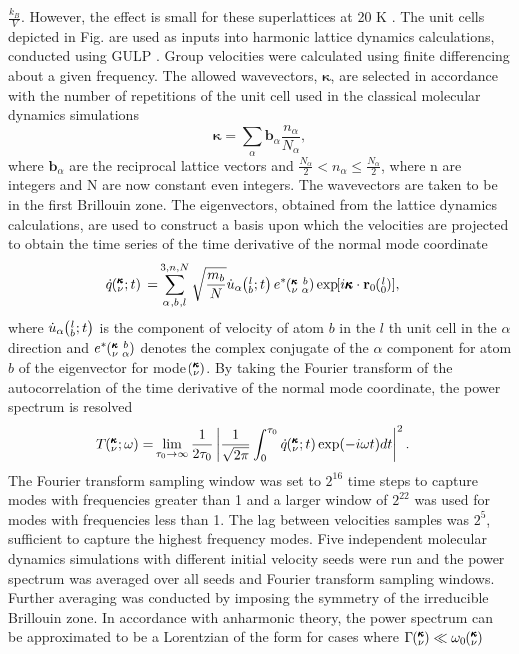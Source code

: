 \documentclass[aps,prb,preprint,preprintnumbers,amsmath,amssymb,floatfix,superscriptaddress]{revtex4}
\newcommand{\EXP}[1]{\exp\mspace{-5.0mu}\left[#1\right]\mspace{-3.0mu}}
\newcommand{\SUM}[2]{\ifthenelse{\equal{#1}{0}}{\sum_{
\alpha_{#2},b_{#2},l_{#2}}^{3,n,N}} {\ifthenelse{\equal{#1}{1}}{\sum_{
\alpha_{#2},b_{#2}}^{3,n}}{\sum_{\pmb{\kappa}#2,\nu#2}^{N,3n}}}}
\newcommand{\ab}[2]{\mspace{-4.0mu}\left(\mspace{-8.0mu}
\begin{smallmatrix}&\ifthenelse{\equal{#1}{}}{a}{#1} \\&\ifthenelse
{\equal{#2}{}}{b}{#2}\end{smallmatrix}\mspace{-3.0mu}\right)}
\newcommand{\kvba}{\mspace{-4.0mu}\left(\mspace{-8.0mu}
\begin{smallmatrix} &\pmb{\kappa} &b \\ &\nu &\alpha\end{smallmatrix}
\mspace{-3.0mu}\right)}
\newcommand{\kvt}{\mspace{-4.0mu}\left(\mspace{-8.0mu}
\begin{smallmatrix}&\pmb{\kappa} \\&\nu\end{smallmatrix}
\mspace{-2.0mu};t\right)}
\newcommand{\kvw}{\mspace{-4.0mu}\left(\mspace{-8.0mu}
\begin{smallmatrix}&\pmb{\kappa} \\&\nu\end{smallmatrix}
\mspace{-2.0mu};\omega\right)}
\newcommand{\kv}{\mspace{-4.0mu}\left(\mspace{-8.0mu}
\begin{smallmatrix}&\pmb{\kappa} \\&\nu\end{smallmatrix}
\mspace{-3.0mu}\right)}
\newcommand{\lbt}{\mspace{-4.0mu}\left(\mspace{-8.0mu}
\begin{smallmatrix}&l \\&b\end{smallmatrix}\mspace{-2.0mu};t\right)}
\begin{document}
$\frac{k_B}{V}$. However, the effect is small for these superlattices at 20 K \cite{Jason}. The unit cells depicted in Fig. are used as inputs into harmonic lattice dynamics calculations, conducted using GULP \cite{GULP}. Group velocities were calculated using finite differencing about a given frequency. The allowed wavevectors, $\pmb{\kappa}$, are selected in accordance with the number of repetitions of the unit cell used in the classical molecular dynamics simulations
\begin{equation}\label{EQ:NMD:allowdkpt}
\pmb{\kappa} = \sum_{\alpha} \pmb{b}_{\alpha} \frac{n_{\alpha}}{N_{\alpha}},
\end{equation}
where $\pmb{b}_\alpha$ are the reciprocal lattice vectors and $ \frac{N_\alpha}{2} < n_\alpha \le \frac {N_\alpha}{2}$, where n are integers and N are now constant even integers. The wavevectors are taken to be in the first Brillouin zone. The eigenvectors, obtained from the lattice dynamics calculations, are used to construct a basis upon which the velocities are projected to obtain the time series of the time derivative of the normal mode coordinate 
\begin{equation}\label{EQ:NMD:qdot}
\begin{split}
\dot{q}\kvt{}{}{}=&\SUM{0}{}\sqrt{\frac{m_b}{N}}\dot{u}_{\alpha}\lbt e^*\kvba\EXP{i\pmb{\kappa}\cdot\mathbf{r}_0\ab{l}{0}},
\end{split}
\end{equation}
where $\dot{u}_{\alpha}\lbt$ is the component of velocity of atom $b$ in the $l$ th unit cell in the $\alpha$ direction and $e^*\kvba$ denotes the complex conjugate of the $\alpha$ component for atom $b$ of the eigenvector for mode $\kv$. By taking the Fourier transform of the autocorrelation of the time derivative of the normal mode coordinate, the power spectrum is resolved \cite{dove_introduction_1993-3}
\begin{equation}\label{EQ:NMD:SED}
\begin{split}
T\kvw=&\lim_{\tau_0\rightarrow\infty}\frac{1}{2\tau_0}\left|\frac{1}{\sqrt{2\pi}}\int_{0}^{\tau_0}\dot{q}\kvt\exp(-i\omega t)dt\right|^2.
\end{split}
\end{equation}
The Fourier transform sampling window was set to $2^{16}$ time steps to capture modes with frequencies greater than 1 and a larger window of $2^{22}$ was used for modes with frequencies less than 1. The lag between velocities samples was $2^5$, sufficient to capture the highest frequency modes. Five independent molecular dynamics simulations with different initial velocity seeds were run and the power spectrum was averaged over all seeds and Fourier transform sampling windows. Further averaging was conducted by imposing the symmetry of the irreducible Brillouin zone. In accordance with anharmonic theory, the power spectrum can be approximated to be a Lorentzian of the form for cases where $\Gamma\kv \ll \omega_0\kv$ \cite{maradudin_scattering_1962}
\end{document}
